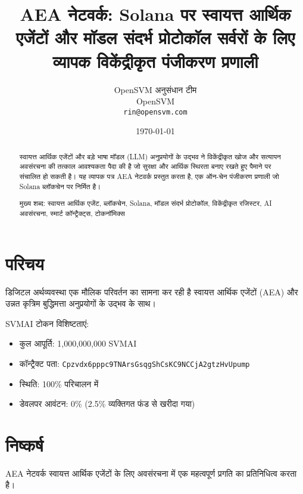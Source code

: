 \documentclass[12pt,a4paper]{article}
\title{AEA नेटवर्क: Solana पर स्वायत्त आर्थिक एजेंटों और मॉडल संदर्भ प्रोटोकॉल सर्वरों के लिए व्यापक विकेंद्रीकृत पंजीकरण प्रणाली}
\author{OpenSVM अनुसंधान टीम \\ OpenSVM \\ \texttt{rin@opensvm.com}}
\date{\today}
\begin{document}
\maketitle

\begin{abstract}
स्वायत्त आर्थिक एजेंटों और बड़े भाषा मॉडल (LLM) अनुप्रयोगों के उद्भव ने विकेंद्रीकृत खोज और सत्यापन अवसंरचना की तत्काल आवश्यकता पैदा की है जो सुरक्षा और आर्थिक स्थिरता बनाए रखते हुए पैमाने पर संचालित हो सकती है। यह व्यापक पत्र AEA नेटवर्क प्रस्तुत करता है, एक ऑन-चेन पंजीकरण प्रणाली जो Solana ब्लॉकचेन पर निर्मित है।

मुख्य शब्द: स्वायत्त आर्थिक एजेंट, ब्लॉकचेन, Solana, मॉडल संदर्भ प्रोटोकॉल, विकेंद्रीकृत रजिस्टर, AI अवसंरचना, स्मार्ट कॉन्ट्रैक्ट्स, टोकनॉमिक्स
\end{abstract}

\section{परिचय}
डिजिटल अर्थव्यवस्था एक मौलिक परिवर्तन का सामना कर रही है स्वायत्त आर्थिक एजेंटों (AEA) और उन्नत कृत्रिम बुद्धिमत्ता अनुप्रयोगों के उद्भव के साथ।

SVMAI टोकन विशिष्टताएं:
\begin{itemize}
\item कुल आपूर्ति: 1,000,000,000 SVMAI
\item कॉन्ट्रैक्ट पता: \texttt{Cpzvdx6pppc9TNArsGsqgShCsKC9NCCjA2gtzHvUpump}
\item स्थिति: 100\% परिचालन में
\item डेवलपर आवंटन: 0\% (2.5\% व्यक्तिगत फंड से खरीदा गया)
\end{itemize}

\section{निष्कर्ष}
AEA नेटवर्क स्वायत्त आर्थिक एजेंटों के लिए अवसंरचना में एक महत्वपूर्ण प्रगति का प्रतिनिधित्व करता है।
\end{document}
